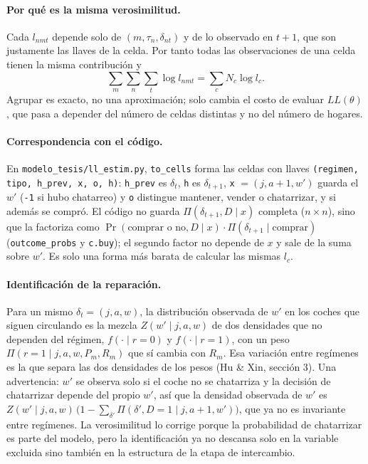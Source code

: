\documentclass{article}
\begin{document}
\paragraph{Por qué es la misma verosimilitud.} Cada $l_{nmt}$ depende solo de $(m,\tau_n,\delta_{nt})$ y de lo observado en $t+1$, que son justamente las llaves de la celda. Por tanto todas las observaciones de una celda tienen la misma contribución y
$$\sum_{m}\sum_{n}\sum_{t}\log l_{nmt}=\sum_c N_c\log l_c .$$
Agrupar es exacto, no una aproximación; solo cambia el costo de evaluar $LL(\theta)$, que pasa a depender del número de celdas distintas y no del número de hogares.

\paragraph{Correspondencia con el código.} En \texttt{modelo\_tesis/ll\_estim.py}, \texttt{to\_cells} forma las celdas con llaves \texttt{(regimen, tipo, h\_prev, x, o, h)}: \texttt{h\_prev} es $\delta_t$, \texttt{h} es $\delta_{t+1}$, \texttt{x} $=(j,a+1,w')$ guarda el $w'$ (\texttt{-1} si hubo chatarreo) y \texttt{o} distingue mantener, vender o chatarrizar, y si además se compró. El código no guarda $\Pi(\delta_{t+1},D\mid x)$ completa ($n\times n$), sino que la factoriza como $\Pr(\text{comprar o no},D\mid x)\cdot\Pi(\delta_{t+1}\mid\text{comprar})$ (\texttt{outcome\_probs} y \texttt{c.buy}); el segundo factor no depende de $x$ y sale de la suma sobre $w'$. Es solo una forma más barata de calcular las mismas $l_c$.

\paragraph{Identificación de la reparación.} Para un mismo $\delta_t=(j,a,w)$, la distribución observada de $w'$ en los coches que siguen circulando es la mezcla $Z(w'\mid j,a,w)$ de dos densidades que no dependen del régimen, $f(\cdot\mid r=0)$ y $f(\cdot\mid r=1)$, con un peso $\Pi(r=1\mid j,a,w,P_m,R_m)$ que sí cambia con $R_m$. Esa variación entre regímenes es la que separa las dos densidades de los pesos (Hu \& Xin, sección 3). Una advertencia: $w'$ se observa solo si el coche no se chatarriza y la decisión de chatarrizar depende del propio $w'$, así que la densidad observada de $w'$ es $Z(w'\mid j,a,w)\,\big(1-\sum_{\delta'}\Pi(\delta',D=1\mid j,a+1,w')\big)$, que ya no es invariante entre regímenes. La verosimilitud lo corrige porque la probabilidad de chatarrizar es parte del modelo, pero la identificación ya no descansa solo en la variable excluida sino también en la estructura de la etapa de intercambio.
\end{document}
